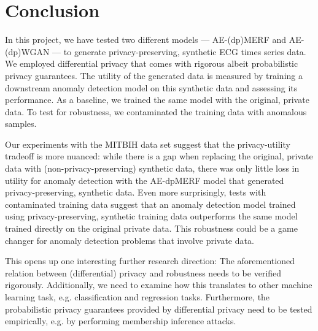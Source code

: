 \section{Conclusion}

In this project, we have tested two different models --- AE-(dp)MERF and AE-(dp)WGAN --- to generate privacy-preserving, synthetic ECG times series data. We employed differential privacy that comes with rigorous albeit probabilistic privacy guarantees. The utility of the generated data is measured by training a downstream anomaly detection model on this synthetic data and assessing its performance. As a baseline, we trained the same model with the original, private data. To test for robustness, we contaminated the training data with anomalous samples.

Our experiments with the MITBIH data set suggest that the privacy-utility tradeoff is more nuanced: while there is a gap when replacing the original, private data with (non-privacy-preserving) synthetic data, there was only little loss in utility for anomaly detection with the AE-dpMERF model that generated privacy-preserving, synthetic data. Even more surprisingly, tests with contaminated training data suggest that an anomaly detection model trained using privacy-preserving, synthetic training data outperforms the same model trained directly on the original private data. This robustness could be a game changer for anomaly detection problems that involve private data.

This opens up one interesting further research direction: The aforementioned relation between (differential) privacy and robustness needs to be verified rigorously. Additionally, we need to examine how this translates to other machine learning task, e.g. classification and regression tasks. Furthermore, the probabilistic privacy guarantees provided by differential privacy need to be tested empirically, e.g. by performing membership inference attacks.
